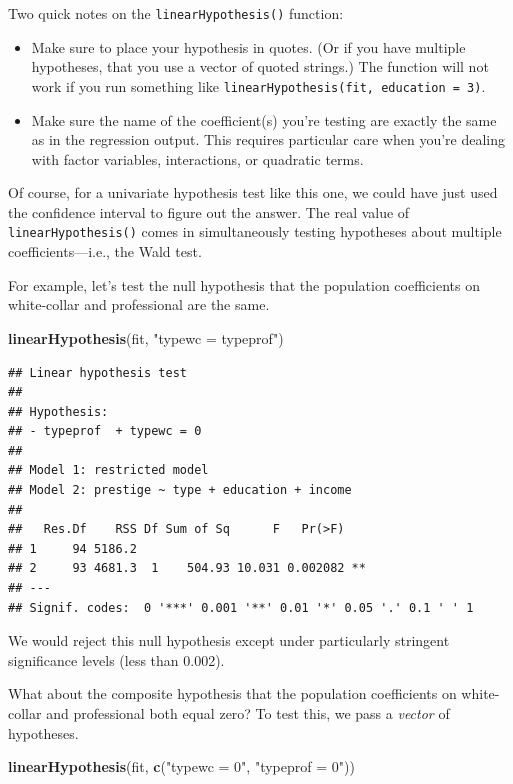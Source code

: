 \documentclass[
  12pt,
  oneside,openany]{book}
\newenvironment{Shaded}{\begin{snugshade}}{\end{snugshade}}
\newcommand{\KeywordTok}[1]{\textcolor[rgb]{0.13,0.29,0.53}{\textbf{#1}}}
\newcommand{\NormalTok}[1]{#1}
\newcommand{\StringTok}[1]{\textcolor[rgb]{0.31,0.60,0.02}{#1}}
\begin{document}
Two quick notes on the \texttt{linearHypothesis()} function:

\begin{itemize}
\item
  Make sure to place your hypothesis in quotes. (Or if you have multiple hypotheses, that you use a vector of quoted strings.) The function will not work if you run something like \texttt{linearHypothesis(fit,\ education\ =\ 3)}.
\item
  Make sure the name of the coefficient(s) you're testing are exactly the same as in the regression output. This requires particular care when you're dealing with factor variables, interactions, or quadratic terms.
\end{itemize}

Of course, for a univariate hypothesis test like this one, we could have just used the confidence interval to figure out the answer. The real value of \texttt{linearHypothesis()} comes in simultaneously testing hypotheses about multiple coefficients---i.e., the Wald test.

For example, let's test the null hypothesis that the population coefficients on white-collar and professional are the same.

\begin{Shaded}
\begin{Highlighting}[]
\KeywordTok{linearHypothesis}\NormalTok{(fit, }\StringTok{"typewc = typeprof"}\NormalTok{)}
\end{Highlighting}
\end{Shaded}

\begin{verbatim}
## Linear hypothesis test
## 
## Hypothesis:
## - typeprof  + typewc = 0
## 
## Model 1: restricted model
## Model 2: prestige ~ type + education + income
## 
##   Res.Df    RSS Df Sum of Sq      F   Pr(>F)   
## 1     94 5186.2                                
## 2     93 4681.3  1    504.93 10.031 0.002082 **
## ---
## Signif. codes:  0 '***' 0.001 '**' 0.01 '*' 0.05 '.' 0.1 ' ' 1
\end{verbatim}

We would reject this null hypothesis except under particularly stringent significance levels (less than 0.002).

What about the composite hypothesis that the population coefficients on white-collar and professional both equal zero? To test this, we pass a \emph{vector} of hypotheses.

\begin{Shaded}
\begin{Highlighting}[]
\KeywordTok{linearHypothesis}\NormalTok{(fit, }\KeywordTok{c}\NormalTok{(}\StringTok{"typewc = 0"}\NormalTok{, }\StringTok{"typeprof = 0"}\NormalTok{))}
\end{Highlighting}
\end{Shaded}
\end{document}
